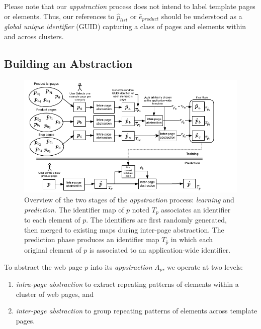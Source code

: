 \documentclass[sigconf,authordraft]{acmart}
\theoremstyle{definition}
\begin{document}
Please note that our \emph{appstraction} process does not intend to label template pages or elements.
Thus, our references to $\hat{p}_{list}$ or $\hat{e}_{product}$ should be understood as a \emph{global unique identifier} (GUID) capturing a class of pages and elements within and across clusters.

\subsection{Building an Abstraction}

\begin{figure}[ht]
  \centering
  \includegraphics[width=0.8\linewidth]{explanations/appstract_overview}
  \caption{Overview of the two stages of the \emph{appstraction} process: \emph{learning} and \emph{prediction}. The identifier map of $p$ noted $T_p$ associates an identifier to each element of $p$. The identifiers are first randomly generated, then merged to existing maps during inter-page abstraction. The prediction phase produces an identifier map $T_{\hat{p}}$ in which each original element of $p$ is associated to an application-wide identifier.}
  \label{fig:appstract_overview}
\end{figure}

To abstract the web page $p$ into its \emph{appstraction} $A_p$, we operate at two levels:
\begin{enumerate}
  \item \textit{intra-page abstraction} to extract repeating patterns of elements within a cluster of web pages, and
  \item \textit{inter-page abstraction} to group repeating patterns of elements across template pages.
\end{enumerate}
\end{document}
